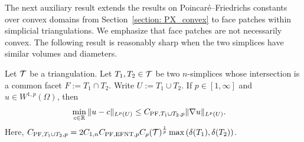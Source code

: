 \documentclass[10pt,letterpaper]{article}
\begin{document}


The next auxiliary result extends the results on Poincar\'e--Friedrichs constants over convex domains from Section~\ref{section: PX_convex} to face patches within simplicial triangulations. We emphasize that face patches are not necessarily convex. The following result is reasonably sharp when the two simplices have similar volumes and diameters.

\begin{lemma}\label{lemma:poincarefriedrichsoverfacepatch}
    Let ${\mathcal T}$ be a triangulation.
    Let $T_{1}, T_{2} \in {\mathcal T}$ be two $n$-simplices whose intersection is a common facet $F := T_1 \cap T_2$. 
    Write $U := T_1 \cup T_2$. 
    If $p \in [1,\infty]$ and $u \in W^{1,p}(\Omega)$,
    then 
    \begin{align*}
        \min\limits_{ c \in {\mathbb R} }
        \| u - c \|_{L^{p}(U)}
        &
        \leq 
        C_{{\rm{PF}},T_1 \cup T_2,p}
        \| \nabla u \|_{L^{p}(U)}
        .
    \end{align*}
    Here, $C_{{\rm{PF}},T_1 \cup T_2,p} = 2 C_{1,n} C_{{\rm PF},{\rm EFNT},p} C_\rho({\mathcal T})^{\frac 1 p} \max\left( {\delta}(T_1), {\delta}(T_2) \right)$. 
\end{lemma}
\end{document}
